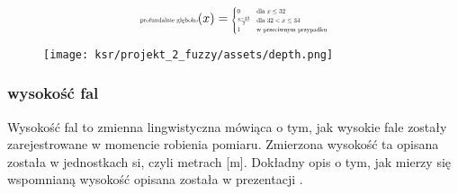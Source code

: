 \documentclass{article}
\begin{document}
\begin{equation*}
\text{\scalebox{0.5}{profundalnie głęboko}}(x) =
\scalebox{0.5}{$
\begin{cases}
0 & \text{dla } x \leq 32 \\
\frac{x - 32}{2} & \text{dla } 32 < x \leq 34 \\
1 & \text{w przeciwnym przypadku}
\end{cases}
$}
\end{equation*}

\begin{figure}[H]
\centering
\texttt{[image: ksr/projekt\_2\_fuzzy/assets/depth.png]}
\label{fig:epsilon_bat}
\end{figure}

\subsubsection{wysokość fal}

\noindent Wysokość fal to zmienna lingwistyczna mówiąca o tym, jak wysokie fale zostały zarejestrowane w momencie robienia pomiaru. Zmierzona wysokość ta opisana została w jednostkach si, czyli metrach [m]. Dokładny opis o tym, jak mierzy się wspomnianą wysokość opisana została w prezentacji \cite{waves}.
\end{document}
